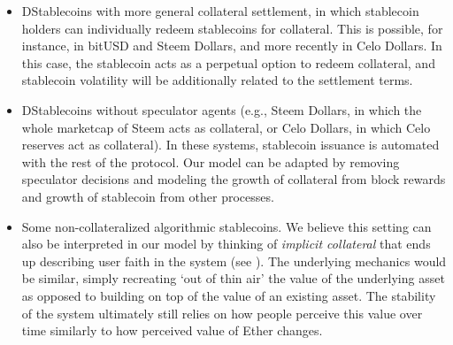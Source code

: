 \begin{itemize}
	\item DStablecoins with more general collateral settlement, in which stablecoin holders can individually redeem stablecoins for collateral. This is possible, for instance, in bitUSD and Steem Dollars, and more recently in Celo Dollars. In this case, the stablecoin acts as a perpetual option to redeem collateral, and stablecoin volatility will be additionally related to the settlement terms.
	\item DStablecoins without speculator agents (e.g., Steem Dollars, in which the whole marketcap of Steem acts as collateral, or Celo Dollars, in which Celo reserves act as collateral). In these systems, stablecoin issuance is automated with the rest of the protocol. Our model can be adapted by removing speculator decisions and modeling the growth of collateral from block rewards and growth of stablecoin from other processes.
	\item Some non-collateralized algorithmic stablecoins. We believe this setting can also be interpreted in our model by thinking of \emph{implicit collateral} that ends up describing user faith in the system (see \cite{klagesmundt2020stablecoins}). The underlying mechanics would be similar, simply recreating `out of thin air' the value of the underlying asset as opposed to building on top of the value of an existing asset. The stability of the system ultimately still relies on how people perceive this value over time similarly to how perceived value of Ether changes.
\end{itemize}